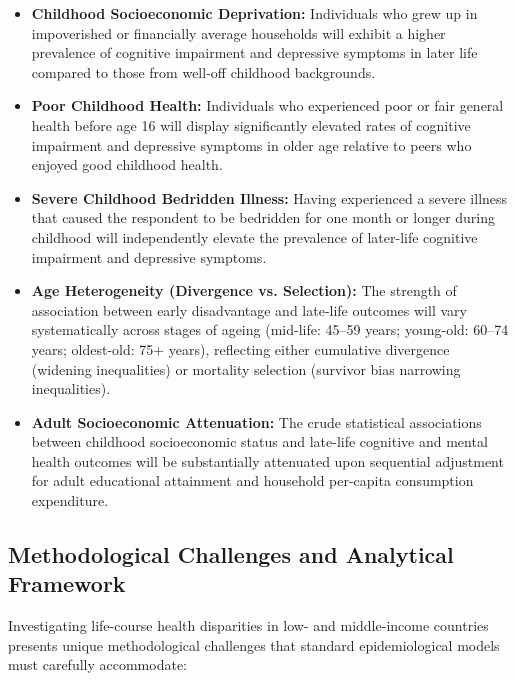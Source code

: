 \begin{itemize}[leftmargin=2.0cm]
    \item[\textbf{Hypothesis 1:}] \textbf{Childhood Socioeconomic Deprivation:} Individuals who grew up in impoverished or financially average households will exhibit a higher prevalence of cognitive impairment and depressive symptoms in later life compared to those from well-off childhood backgrounds.
    
    \item[\textbf{Hypothesis 2:}] \textbf{Poor Childhood Health:} Individuals who experienced poor or fair general health before age 16 will display significantly elevated rates of cognitive impairment and depressive symptoms in older age relative to peers who enjoyed good childhood health.
    
    \item[\textbf{Hypothesis 3:}] \textbf{Severe Childhood Bedridden Illness:} Having experienced a severe illness that caused the respondent to be bedridden for one month or longer during childhood will independently elevate the prevalence of later-life cognitive impairment and depressive symptoms.
    
    \item[\textbf{Hypothesis 4:}] \textbf{Age Heterogeneity (Divergence vs. Selection):} The strength of association between early disadvantage and late-life outcomes will vary systematically across stages of ageing (mid-life: 45--59 years; young-old: 60--74 years; oldest-old: 75+ years), reflecting either cumulative divergence (widening inequalities) or mortality selection (survivor bias narrowing inequalities).
    
    \item[\textbf{Hypothesis 5:}] \textbf{Adult Socioeconomic Attenuation:} The crude statistical associations between childhood socioeconomic status and late-life cognitive and mental health outcomes will be substantially attenuated upon sequential adjustment for adult educational attainment and household per-capita consumption expenditure.
\end{itemize}

\subsection{Methodological Challenges and Analytical Framework}
Investigating life-course health disparities in low- and middle-income countries presents unique methodological challenges that standard epidemiological models must carefully accommodate:

